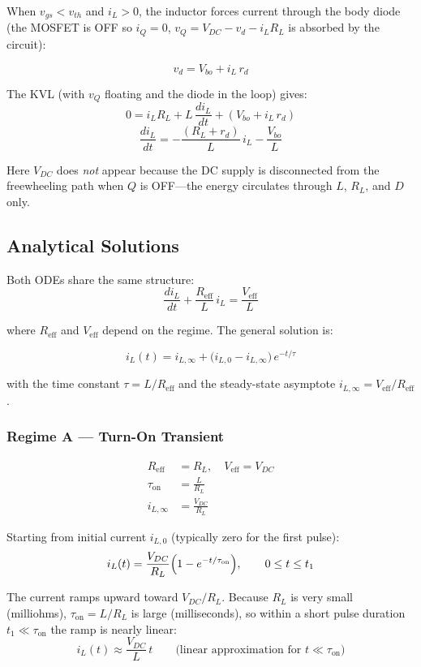 \documentclass[11pt, a4paper]{article}
\begin{document}
When $v_{gs} < v_{th}$ and $i_L > 0$, the inductor forces current through the body diode (the MOSFET is OFF so $i_Q = 0$, $v_Q = V_{DC} - v_d - i_L R_L$ is absorbed by the circuit):

\[
    v_d = V_{bo} + i_L\,r_d
\]

The KVL (with $v_Q$ floating and the diode in the loop) gives:
\[
    0 = i_L R_L + L\,\frac{di_L}{dt} + (V_{bo} + i_L\,r_d)
\]
\[
    \boxed{\frac{di_L}{dt} = -\frac{(R_L + r_d)}{L}\,i_L - \frac{V_{bo}}{L}}
\]

Here $V_{DC}$ does \emph{not} appear because the DC supply is disconnected from the freewheeling path when $Q$ is OFF—the energy circulates through $L$, $R_L$, and $D$ only.

\subsection{Analytical Solutions}

Both ODEs share the same structure:
\[
    \frac{di_L}{dt} + \frac{R_{\text{eff}}}{L}\,i_L = \frac{V_{\text{eff}}}{L}
\]

where $R_{\text{eff}}$ and $V_{\text{eff}}$ depend on the regime. The general solution is:

\[
    i_L(t) = i_{L,\infty} + \bigl(i_{L,0} - i_{L,\infty}\bigr)\,e^{-t/\tau}
\]

with the time constant $\tau = L / R_{\text{eff}}$ and the steady-state asymptote $i_{L,\infty} = V_{\text{eff}} / R_{\text{eff}}$.

\subsubsection{Regime A — Turn-On Transient}

\begin{align*}
    R_{\text{eff}} &= R_L, \quad V_{\text{eff}} = V_{DC}\\
    \tau_{\text{on}} &= \frac{L}{R_L}\\
    i_{L,\infty} &= \frac{V_{DC}}{R_L}
\end{align*}

Starting from initial current $i_{L,0}$ (typically zero for the first pulse):
\[
    i_L(t) = \frac{V_{DC}}{R_L}\Bigl(1 - e^{-t/\tau_{\text{on}}}\Bigr), \qquad 0 \leq t \leq t_1
\]

The current ramps upward toward $V_{DC}/R_L$. Because $R_L$ is very small (milliohms), $\tau_{\text{on}} = L/R_L$ is large (milliseconds), so within a short pulse duration $t_1 \ll \tau_{\text{on}}$ the ramp is nearly linear:
\[
    i_L(t) \approx \frac{V_{DC}}{L}\,t \qquad \text{(linear approximation for } t \ll \tau_{\text{on}}\text{)}
\]
\end{document}

